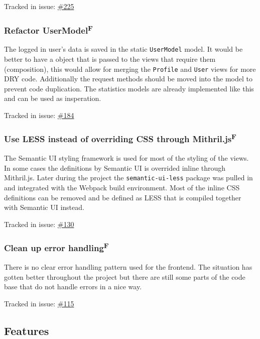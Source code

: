\documentclass[12pt,a4paper]{report}
\begin{document}
Tracked in issue: \href{https://github.com/LuleaUniversityOfTechnology/2018-project-roaster/issues/225}{\#225}

\subsubsection{Refactor UserModel\texorpdfstring{\textsuperscript{F}}{}}
The logged in user's data is saved in the static \texttt{UserModel} model. It would be better to have a object that is passed to the views that require them (composition), this would allow for merging the \texttt{Profile} and \texttt{User} views for more DRY code. Additionally the request methods should be moved into the model to prevent code duplication. The statistics models are already implemented like this and can be used as insperation.

Tracked in issue: \href{https://github.com/LuleaUniversityOfTechnology/2018-project-roaster/issues/184}{\#184}

\subsubsection{Use LESS instead of overriding CSS through Mithril.js\texorpdfstring{\textsuperscript{F}}{}}
The Semantic UI styling framework is used for most of the styling of the views. In some cases the definitions by Semantic UI is overrided inline through Mithril.js. Later during the project the \texttt{semantic-ui-less} package was pulled in and integrated with the Webpack build environment. Most of the inline CSS definitions can be removed and be defined as LESS that is compiled together with Semantic UI instead.

Tracked in issue: \href{https://github.com/LuleaUniversityOfTechnology/2018-project-roaster/issues/130}{\#130}

\subsubsection{Clean up error handling\texorpdfstring{\textsuperscript{F}}{}}
There is no clear error handling pattern used for the frontend. The situation has gotten better throughout the project but there are still some parts of the code base that do not handle errors in a nice way.

Tracked in issue: \href{https://github.com/LuleaUniversityOfTechnology/2018-project-roaster/issues/115}{\#115}

\subsection*{Features}
\end{document}

